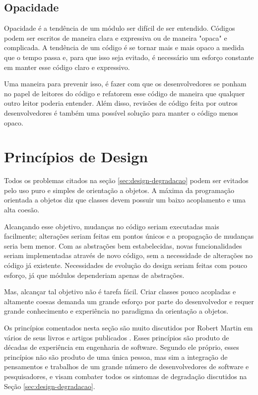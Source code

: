 \subsection{Opacidade}

Opacidade é a tendência de um módulo ser difícil de ser entendido. Códigos podem
ser escritos de maneira clara e expressiva ou de maneira "opaca" e complicada. A
tendência de um código é se tornar mais e mais opaco a medida que o tempo passa
e, para que isso seja evitado, é necessário um esforço constante em manter esse 
código claro e expressivo. 

Uma maneira para prevenir isso, é fazer com que os desenvolvedores se ponham no
papel de leitores do código e refatorem esse código de maneira que qualquer
outro  leitor poderia entender. Além disso, revisões de código feita por outros
desenvolvedores é também uma possível solução para manter o código menos opaco.

\section{Princípios de Design}
\label{sec:design-oo-principios}

Todos os problemas citados na seção \ref{sec:design-degradacao} podem ser
evitados pelo uso puro e simples de orientação a objetos. A máxima da
programação orientada a objetos diz que classes devem possuir um baixo
acoplamento e uma alta coesão.

Alcançando esse objetivo, mudanças no código seriam executadas mais facilmente;
alterações seriam feitas em pontos únicos e a propagação de mudanças seria bem
menor. Com as abstrações bem estabelecidas, novas funcionalidades seriam
implementadas através de novo código, sem a necessidade de alterações no código
já existente. Necessidades de evolução do design seriam feitas com pouco
esforço, já que módulos dependeriam apenas de abstrações.

Mas, alcançar tal objetivo não é tarefa fácil. Criar classes pouco acopladas e
altamente coesas demanda um grande esforço por parte do desenvolvedor e requer
grande conhecimento e experiência no paradigma da orientação a objetos.

Os princípios comentados nesta seção são muito discutidos por Robert Martin
em vários de seus livros e artigos publicados \cite{bob-martin}.
Esses princípios são produto de décadas de experiência em engenharia de
software. Segundo ele próprio, esses princípios não são produto de uma única 
pessoa, mas sim a integração de pensamentos e trabalhos de um grande número de 
desenvolvedores de software  e pesquisadores, e visam combater todos os sintomas
de degradação discutidos na Seção \ref{sec:design-degradacao}.

